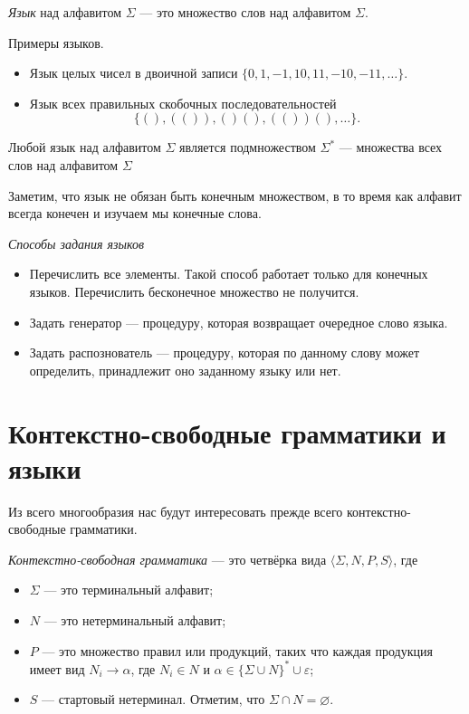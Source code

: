 \begin{definition}
\textit{Язык} над алфавитом $\Sigma$ --- это множество слов над алфавитом $\Sigma$.
\end{definition}

\begin{example}

Примеры языков.

  \begin{itemize}
    \item Язык целых чисел в двоичной записи $\{0, 1, -1, 10, 11, -10, -11, \dots\}.$
    \item Язык всех правильных скобочных последовательностей $$\{(), (()), ()(), (())(), \dots\}.$$
  \end{itemize}
\end{example}

Любой язык над алфавитом $\Sigma$ является подмножеством $\Sigma^*$ --- множества всех слов над алфавитом $\Sigma$

Заметим, что язык не обязан быть конечным множеством, в то время как алфавит всегда конечен и изучаем мы конечные слова.

\textit{Способы задания языков}
\begin{itemize}
\item Перечислить все элементы. Такой способ работает только для конечных языков. Перечислить бесконечное множество не получится.
\item Задать генератор --- процедуру, которая возвращает очередное слово языка.
\item Задать распознователь --- процедуру, которая по данному слову может определить, принадлежит оно заданному языку или нет.
\end{itemize}


\section{Контекстно-свободные грамматики и языки}\label{CFG}

Из всего многообразия нас будут интересовать прежде всего контекстно-свободные грамматики.

\begin{definition}
\textit{Контекстно-свободная грамматика} --- это четвёрка вида $\langle \Sigma, N, P, S \rangle$, где
\begin{itemize}
  \item $\Sigma$ --- это терминальный алфавит;
  \item $N$ --- это нетерминальный алфавит;
  \item $P$ --- это множество правил или продукций, таких что каждая продукция имеет вид $N_i \to \alpha$, где $N_i \in N$ и $\alpha \in \{\Sigma \cup N\}^* \cup {\varepsilon}$;
  \item $S$ --- стартовый нетерминал.
  Отметим, что $\Sigma \cap N = \varnothing$.
\end{itemize}
\end{definition}

